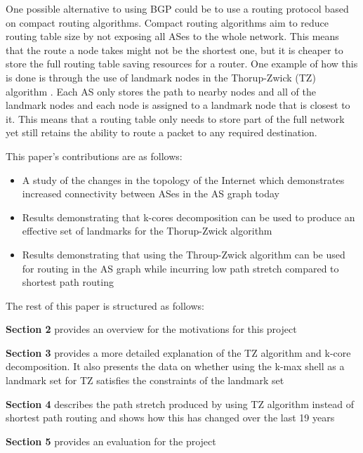 \documentclass{mpaper}
\begin{document}
One possible alternative to using BGP could be to use a routing protocol based on compact routing algorithms. Compact routing algorithms aim to reduce routing table size by not exposing all ASes to the whole network. This means that the route a node takes might not be the shortest one, but it is cheaper to store the full routing table saving resources for a router. One example of how this is done is through the use of landmark nodes in the Thorup-Zwick (TZ) algorithm \cite{thorup}. Each AS only stores the path to nearby nodes and all of the landmark nodes and each node is assigned to a landmark node that is closest to it. This means that a routing table only needs to store part of the full network yet still retains the ability to route a packet to any required destination. 

This paper's contributions are as follows:
\begin{itemize}
    \item A study of the changes in the topology of the Internet which demonstrates increased connectivity between ASes in the AS graph today
    \item Results demonstrating that k-cores decomposition can be used to produce an effective set of landmarks for the Thorup-Zwick algorithm
    \item Results demonstrating that using the Throup-Zwick algorithm can be used for routing in the AS graph while incurring low path stretch compared to shortest path routing 
\end{itemize}

The rest of this paper is structured as follows:\newline

\textbf{Section 2} provides an overview for the motivations for this project\newline

\textbf{Section 3} provides a more detailed explanation of the TZ algorithm and k-core decomposition. It also presents the data on whether using the k-max shell as a landmark set for TZ satisfies the constraints of the landmark set\newline

\textbf{Section 4 } describes the path stretch produced by using TZ algorithm instead of shortest path routing and shows how this has changed over the last 19 years\newline

\textbf{Section 5} provides an evaluation for the project\newline
\end{document}
